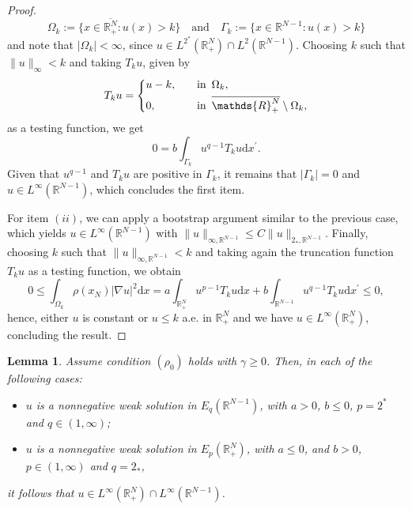 \documentclass[12pt,reqno]{amsart}
\newtheorem{lemma}[theorem]{Lemma}
\begin{document}
\begin{proof}
\begin{equation}\label{Omega k e Gamma k}
\Omega_k:=\{x\in \overline{\mathds{R}^N_+}: u(x)>k\}\quad\text{and}\quad \Gamma_k:=\{x\in \mathds{R}^{N-1}:u(x)>k\}
\end{equation}
and note that $|\Omega_k|<\infty$, since $u\in L^{2^\ast}(\mathds{R}^N_+)\cap L^2(\mathds{R}^{N-1})$. Choosing $k$ such that $\|u\|_\infty<k$ and taking $T_ku$, given by
\begin{equation*}
    T_ku=\left\lbrace
		\begin{aligned}
			&u-k,\quad&\mbox{in }&\,\Omega_k,
			\vspace{0.2cm}\\
		&0,\quad &\mbox{in }&\,\overline{\mathds{R}^N_+}\setminus\Omega_k,
		\end{aligned}
		\right. 
\end{equation*}
as a testing function, we get
\begin{equation*}
    0=b\int_{\Gamma_k}u^{q-1}T_ku\mathrm{d}x^\prime.
\end{equation*}
Given that $u^{q-1}$ and $T_ku$ are positive in $\Gamma_k$, it remains that $|\Gamma_k|=0$ and $u \in L^\infty(\mathds{R}^{N-1})$, which concludes the first item. 

For item $(ii)$, we can apply a bootstrap argument similar to the previous case, which yields $u \in L^\infty(\mathds{R}^{N-1})$ with $\|u\|_{\infty, \mathds{R}^{N-1}}\leq C\|u\|_{2_\ast, \mathds{R}^{N-1}}$. Finally, choosing $k$ such that $\|u\|_{\infty,\mathds{R}^{N-1}}<k$ and taking again the truncation function $T_ku$ as a testing function, we obtain
\begin{equation*}
    0\leq \int_{\Omega_k}\rho(x_N)|\nabla u|^2\mathrm{d}x=a\int_{\mathds{R}^N_+}u^{p-1}T_ku\mathrm{d}x+b\int_{\mathds{R}^{N-1}}u^{q-1}T_ku\mathrm{d}x^\prime\leq 0,
\end{equation*}
hence, either $u$ is constant or $u\leq k$ a.e. in $\mathds{R}^N_+$ and we have $u \in L^\infty(\mathds{R}^N_+)$, concluding the result.
\end{proof}


\begin{lemma}\label{Linfty 2}
Assume condition $(\rho_0)$ holds with $\gamma\geq 0$. Then, in each of the following cases:
\begin{itemize}
\item[$(i)$] $u$ is a nonnegative weak solution in $E_q(\mathds{R}^{N-1})$, with $a > 0$, $b \leq 0$, $p=2^\ast$ and $q\in(1,\infty)$;
\item[$(ii)$] $u$ is a nonnegative weak solution in $E_p(\mathds{R}^N_+)$, with $a \leq 0$, and $b > 0$, $p\in(1,\infty)$ and $q=2_\ast$,
\end{itemize}
it follows that $u \in L^\infty(\mathds{R}^N_+) \cap L^\infty(\mathds{R}^{N-1})$.
\end{lemma}
\end{document}
